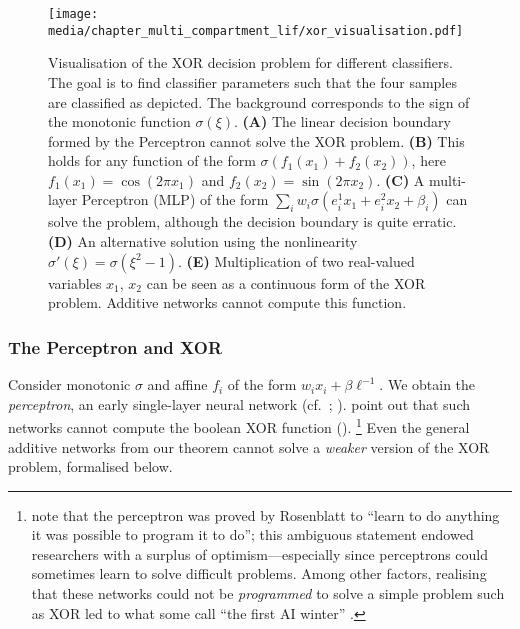 \begin{figure}
	\centering
	\texttt{[image: media/chapter\_multi\_compartment\_lif/xor\_visualisation.pdf]}%
	{\label{fig:xor_visualisation_a}}%
	{\label{fig:xor_visualisation_b}}%
	{\label{fig:xor_visualisation_c}}%
	{\label{fig:xor_visualisation_d}}%
	{\label{fig:xor_visualisation_e}}%
	\caption[Visualisation of the XOR decision problem for different classifiers]{Visualisation of the XOR decision problem for different classifiers. The goal is to find classifier parameters such that the four samples are classified as depicted.
	The background corresponds to the sign of the monotonic function $\sigma(\xi)$.
	\textbf{(A)} The linear decision boundary formed by the Perceptron cannot solve the XOR problem.
	\textbf{(B)} This holds for any function of the form $\sigma(f_1(x_1) + f_2(x_2))$, here $f_1(x_1) = \cos(2\pi x_1)$ and $f_2(x_2) = \sin(2\pi x_2)$.
	\textbf{(C)} A multi-layer Perceptron (MLP) of the form $\sum_i w_i \sigma(e_i^1 x_1 + e_i^2 x_2 + \beta_i )$ can solve the problem, although the decision boundary is quite erratic.
	\textbf{(D)} An alternative solution using the nonlinearity $\sigma'(\xi) = \sigma(\xi^2 - 1)$.
	\textbf{(E)} Multiplication of two real-valued variables $x_1$, $x_2$ can be seen as a continuous form of the XOR problem.
	Additive networks cannot compute this function.
	}
	\label{fig:xor_visualisation}
\end{figure}

\subsubsection{The Perceptron and XOR}
Consider monotonic $\sigma$ and affine $f_i$ of the form $w_i x_i + \beta \ell^{-1}$.
We obtain the \emph{perceptron}, an early single-layer neural network (cf.~; \cite{rosenblatt1958perceptron}).
 point out that such networks cannot compute the boolean XOR function ().%
\footnote{ note that the perceptron was proved by Rosenblatt to \enquote{learn to do anything it was possible to program it to do}; this ambiguous statement endowed researchers with a surplus of optimism---especially since perceptrons could sometimes learn to solve difficult problems.
Among other factors, realising that these networks could not be \emph{programmed} to solve a simple problem such as XOR led to what some call \enquote{the first AI winter} \citep[e.g.,][]{muthukrishnan2020brief}.}
Even the general additive networks from our theorem cannot solve a \emph{weaker} version of the XOR problem, formalised below.

